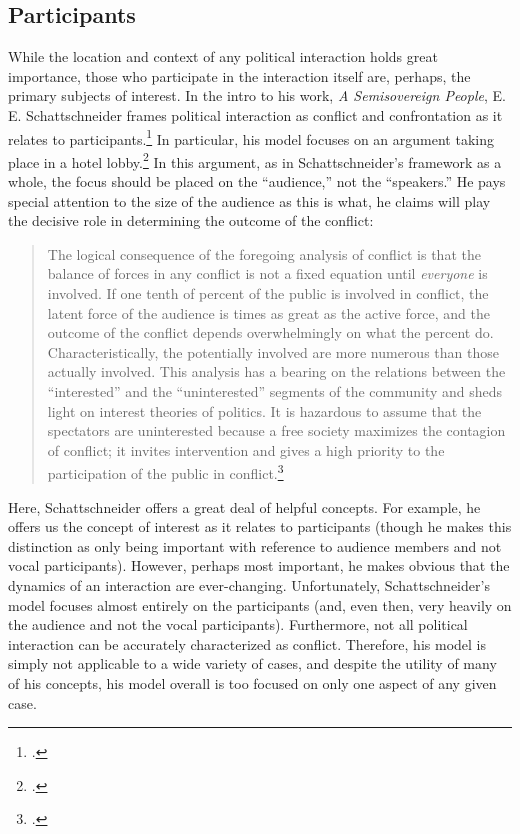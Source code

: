 \documentclass{article}
\begin{document}
\subsection{Participants}
While the location and context of any political interaction holds great importance, those who participate in the interaction itself are, perhaps, the primary subjects of interest. 
In the intro to his work, \emph{A Semisovereign People}, E. E. Schattschneider frames political interaction as conflict and confrontation as it relates to participants.\footcite{schattschneider75} 
In particular, his model focuses on an argument taking place in a hotel lobby.\footcite[1--5]{schattschneider75} 
In this argument, as in Schattschneider's framework as a whole, the focus should be placed on the ``audience,'' not the ``speakers.'' 
He pays special attention to the size of the audience as this is what, he claims will play the decisive role in determining the outcome of the conflict: 
\blockquote{The logical consequence of the foregoing analysis of conflict is that the balance of forces in any conflict is not a fixed equation until \emph{everyone} is involved. If one tenth of  percent of the public is involved in conflict, the latent force of the audience is  times as great as the active force, and the outcome of the conflict depends overwhelmingly on what the  percent do. Characteristically, the potentially involved are more numerous than those actually involved. This analysis has a bearing on the relations between the ``interested'' and the ``uninterested'' segments of the community and sheds light on interest theories of politics. It is hazardous to assume that the spectators are uninterested because a free society maximizes the contagion of conflict; it invites intervention and gives a high priority to the participation of the public in conflict.\footcite[5]{schattschneider75}}
Here, Schattschneider offers a great deal of helpful concepts. 
For example, he offers us the concept of interest as it relates to participants (though he makes this distinction as only being important with reference to audience members and not vocal participants). 
However, perhaps most important, he makes obvious that the dynamics of an interaction are ever-changing. 
Unfortunately, Schattschneider's model focuses almost entirely on the participants (and, even then, very heavily on the audience and not the vocal participants). 
Furthermore, not all political interaction can be accurately characterized as conflict. 
Therefore, his model is simply not applicable to a wide variety of cases, and despite the utility of many of his concepts, his model overall is too focused on only one aspect of any given case.
\end{document}
